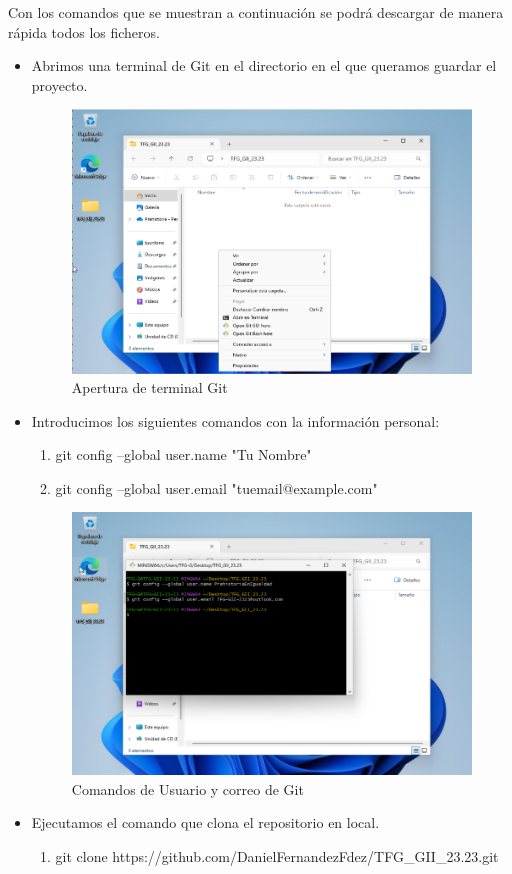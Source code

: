 Con los comandos que se muestran a continuación se podrá descargar de manera rápida todos los ficheros.
\begin{itemize}
    \item Abrimos una terminal de Git en el directorio en el que queramos guardar el proyecto.
    \begin{figure}[h]
        \centering
        \includegraphics[width=0.75\linewidth]{Imagenes/AperturaTerminalGit.png}
        \caption{Apertura de terminal Git}
        \label{Apertura de terminal Git}
    \end{figure}
    \FloatBarrier
    \item Introducimos los siguientes comandos con la información personal:
    \begin{enumerate}
        \item git config --global user.name "Tu Nombre"
        \item git config --global user.email "tuemail@example.com"
    \end{enumerate}

    \begin{figure}[h]
        \centering
    \includegraphics[width=1\linewidth]{Imagenes/ComandosUsuarioCorreoGit.png}
        \caption{Comandos de Usuario y correo de Git}
        \label{Comandos de Usuario y correo de Git}
    \end{figure}
    \FloatBarrier
    \item Ejecutamos el comando que clona el repositorio en local.
    \begin{enumerate}
        \item git clone https://github.com/DanielFernandezFdez/TFG\_GII\_23.23.git
    \end{enumerate}


\end{itemize}

